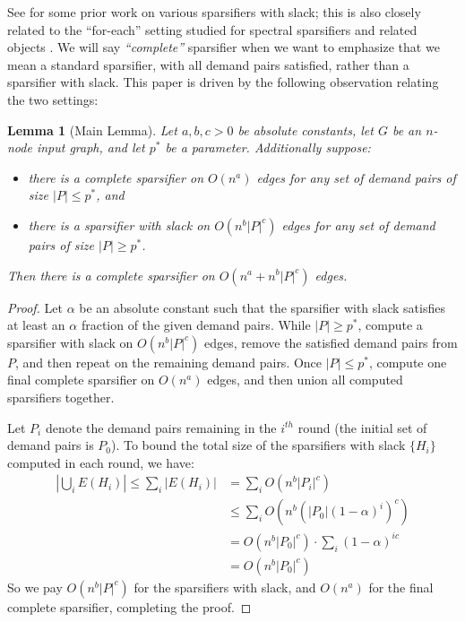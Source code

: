 \documentclass{article}
\newtheorem{lemma}[theorem]{Lemma}
\begin{document}
See \cite{CDG06, Dinitz07, KRXY07} for some prior work on various sparsifiers with slack; this is also closely related to the ``for-each'' setting studied for spectral sparsifiers and related objects \cite{ACKQWZ16, CGPSSW18}.
We will say \emph{``complete''} sparsifier when we want to emphasize that we mean a standard sparsifier, with all demand pairs satisfied, rather than a sparsifier with slack.
This paper is driven by the following observation relating the two settings:
\begin{lemma} [Main Lemma] \label{lem:firstmain}
Let $a, b, c>0$ be absolute constants, let $G$ be an $n$-node input graph, and let $p^*$ be a parameter.
Additionally suppose:
\begin{itemize}
\item there is a complete sparsifier on $O(n^a)$ edges for any set of demand pairs of size $|P| \le p^*$, and

\item there is a sparsifier with slack on $O(n^b |P|^c)$ edges for any set of demand pairs of size $|P| \ge p^*$.
\end{itemize}
Then there is a complete sparsifier on $O(n^a + n^b |P|^c)$ edges.
\end{lemma}
\begin{proof}
Let $\alpha$ be an absolute constant such that the sparsifier with slack satisfies at least an $\alpha$ fraction of the given demand pairs.
While $|P| \ge p^*$, compute a sparsifier with slack on $O(n^b |P|^c)$ edges, remove the satisfied demand pairs from $P$, and then repeat on the remaining demand pairs.
Once $|P| \le p^*$, compute one final complete sparsifier on $O(n^a)$ edges, and then union all computed sparsifiers together.

Let $P_i$ denote the demand pairs remaining in the $i^{th}$ round (the initial set of demand pairs is $P_0$).
To bound the total size of the sparsifiers with slack $\{H_i\}$ computed in each round, we have:
\begin{align*}
\left| \bigcup_i E(H_i) \right| \le \sum_i |E(H_i)| &= \sum_i O\left(n^b |P_i|^c \right)\\
&\le \sum_i O\left(n^b \left(|P_0|(1-\alpha)^{i}\right)^c \right) \tag*{$\alpha$ fraction satisfied each round}\\
&= O\left(n^b |P_0|^c\right) \cdot \sum_i (1-\alpha)^{ic}\\
&= O\left( n^b |P_0|^c \right) \tag*{telescoping sum.}
\end{align*}
So we pay $O(n^b |P|^c)$ for the sparsifiers with slack, and $O(n^a)$ for the final complete sparsifier, completing the proof.
\end{proof}
\end{document}
